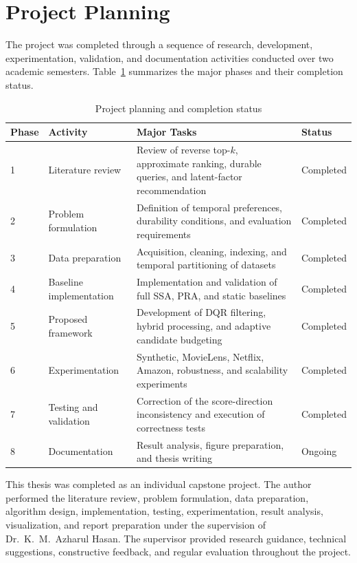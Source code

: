 
\section{Project Planning}
\label{sec:project_planning}

The project was completed through a sequence of research, development, experimentation, validation, and documentation activities conducted over two academic semesters. Table~\ref{tab:project_plan} summarizes the major phases and their completion status.

\begin{table}[htbp]
\centering
\caption{Project planning and completion status}
\label{tab:project_plan}
\small
\renewcommand{\arraystretch}{1.25}
\setlength{\tabcolsep}{4pt}
\begin{tabularx}{\textwidth}{|p{1.0cm}|p{3.4cm}|X|p{2.0cm}|}
\hline
\textbf{Phase} &
\textbf{Activity} &
\textbf{Major Tasks} &
\textbf{Status} \\
\hline
1 &
Literature review &
Review of reverse top-$k$, approximate ranking, durable queries, and latent-factor recommendation &
Completed \\
\hline
2 &
Problem formulation &
Definition of temporal preferences, durability conditions, and evaluation requirements &
Completed \\
\hline
3 &
Data preparation &
Acquisition, cleaning, indexing, and temporal partitioning of datasets &
Completed \\
\hline
4 &
Baseline implementation &
Implementation and validation of full SSA, PRA, and static baselines &
Completed \\
\hline
5 &
Proposed framework &
Development of DQR filtering, hybrid processing, and adaptive candidate budgeting &
Completed \\
\hline
6 &
Experimentation &
Synthetic, MovieLens, Netflix, Amazon, robustness, and scalability experiments &
Completed \\
\hline
7 &
Testing and validation &
Correction of the score-direction inconsistency and execution of correctness tests &
Completed \\
\hline
8 &
Documentation &
Result analysis, figure preparation, and thesis writing &
Ongoing \\
\hline
\end{tabularx}
\end{table}

This thesis was completed as an individual capstone project. The author performed the literature review, problem formulation, data preparation, algorithm design, implementation, testing, experimentation, result analysis, visualization, and report preparation under the supervision of Dr.\ K.\ M.\ Azharul Hasan. The supervisor provided research guidance, technical suggestions, constructive feedback, and regular evaluation throughout the project.

